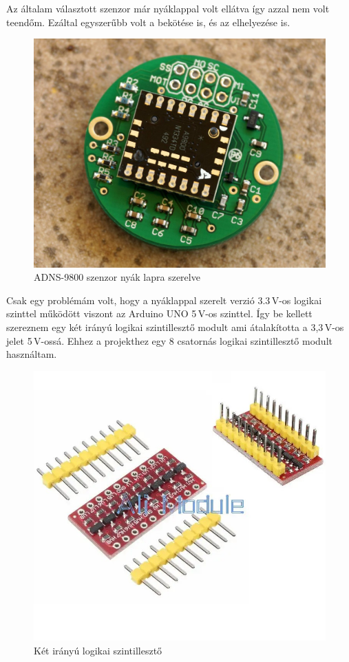 \documentclass[]{thesis-ekf}
\theoremstyle{definition}
\theoremstyle{remark}
\begin{document}
Az általam választott szenzor már nyáklappal volt ellátva így azzal nem volt teendőm. Ezáltal egyszerűbb volt a bekötése is, és az elhelyezése is.

\begin{figure}[th!]
	\centering
	\includegraphics[width=0.5\linewidth]{ADNS9800}
	\caption[ADNS9800]{ADNS-9800 szenzor nyák lapra szerelve}
	\label{fig:adns9800}
\end{figure}

Csak egy problémám volt, hogy a nyáklappal szerelt verzió 3.3\,V-os logikai szinttel működött viszont az Arduino UNO 5\,V-os szinttel. Így be kellett szereznem egy két irányú logikai szintillesztő modult ami átalakította a 3,3\,V-os jelet 5\,V-ossá. Ehhez a projekthez egy 8 csatornás logikai szintillesztő modult használtam.

\begin{figure}[th!]
	\centering
	\includegraphics[width=0.6\linewidth]{szintilleszto}
	\caption[Logikai szintillesztő]{Két irányú logikai szintillesztő}
	\label{fig:szintilleszto}
\end{figure}
\end{document}

